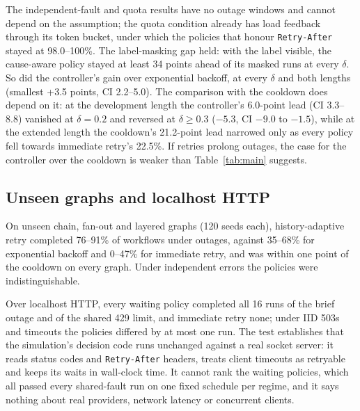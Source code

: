 \documentclass[conference,a4paper]{IEEEtran}
\begin{document}
The independent-fault and quota results have no outage windows and cannot depend on the assumption; the quota condition already has load feedback through its token bucket, under which the policies that honour \texttt{Retry-After} stayed at 98.0--100\%. The label-masking gap held: with the label visible, the cause-aware policy stayed at least 34 points ahead of its masked runs at every $\delta$. So did the controller's gain over exponential backoff, at every $\delta$ and both lengths (smallest +3.5 points, CI 2.2--5.0). The comparison with the cooldown does depend on it: at the development length the controller's 6.0-point lead (CI 3.3--8.8) vanished at $\delta=0.2$ and reversed at $\delta\ge0.3$ ($-5.3$, CI $-9.0$ to $-1.5$), while at the extended length the cooldown's 21.2-point lead narrowed only as every policy fell towards immediate retry's 22.5\%. If retries prolong outages, the case for the controller over the cooldown is weaker than Table~\ref{tab:main} suggests.

\subsection{Unseen graphs and localhost HTTP}
On unseen chain, fan-out and layered graphs (120 seeds each), history-adaptive retry completed 76--91\% of workflows under outages, against 35--68\% for exponential backoff and 0--47\% for immediate retry, and was within one point of the cooldown on every graph. Under independent errors the policies were indistinguishable.

Over localhost HTTP, every waiting policy completed all 16 runs of the brief outage and of the shared 429 limit, and immediate retry none; under IID 503s and timeouts the policies differed by at most one run. The test establishes that the simulation's decision code runs unchanged against a real socket server: it reads status codes and \texttt{Retry-After} headers, treats client timeouts as retryable and keeps its waits in wall-clock time. It cannot rank the waiting policies, which all passed every shared-fault run on one fixed schedule per regime, and it says nothing about real providers, network latency or concurrent clients.
\end{document}
